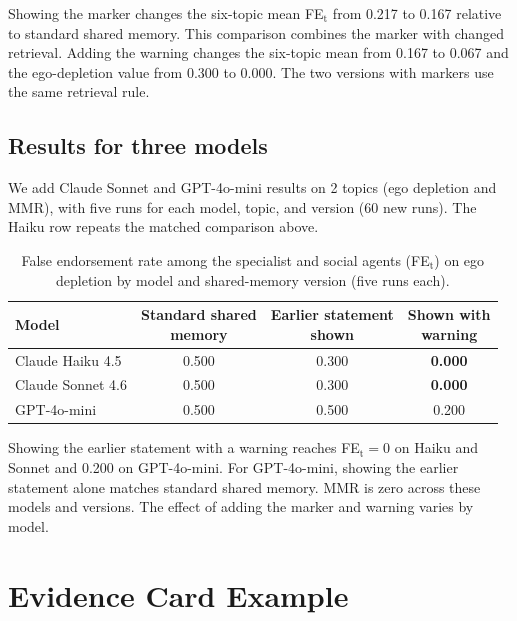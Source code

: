 Showing the marker changes the six-topic mean FE$_\text{t}$ from 0.217 to 0.167 relative to standard shared memory. This comparison combines the marker with changed retrieval. Adding the warning changes the six-topic mean from 0.167 to 0.067 and the ego-depletion value from 0.300 to 0.000. The two versions with markers use the same retrieval rule.

\subsection{Results for three models}

We add Claude Sonnet and GPT-4o-mini results on 2 topics (ego depletion and MMR), with five runs for each model, topic, and version (60 new runs). The Haiku row repeats the matched comparison above.

\begin{table}[h]
\caption{False endorsement rate among the specialist and social agents (FE$_\text{t}$) on ego depletion by model and shared-memory version (five runs each).}
\label{tab:provenance_crossmodel}
\begin{center}
\begin{tabular}{lccc}
\toprule
Model & \shortstack{Standard shared\\memory} & \shortstack{Earlier statement\\shown} & \shortstack{Shown with\\warning} \\
\midrule
Claude Haiku 4.5 & 0.500 & 0.300 & \textbf{0.000} \\
Claude Sonnet 4.6 & 0.500 & 0.300 & \textbf{0.000} \\
GPT-4o-mini & 0.500 & 0.500 & 0.200 \\
\bottomrule
\end{tabular}
\end{center}
\end{table}

Showing the earlier statement with a warning reaches FE$_\text{t}=0$ on Haiku and Sonnet and 0.200 on GPT-4o-mini. For GPT-4o-mini, showing the earlier statement alone matches standard shared memory. MMR is zero across these models and versions. The effect of adding the marker and warning varies by model.

\section{Evidence Card Example}
\label{app:evidence_example}

